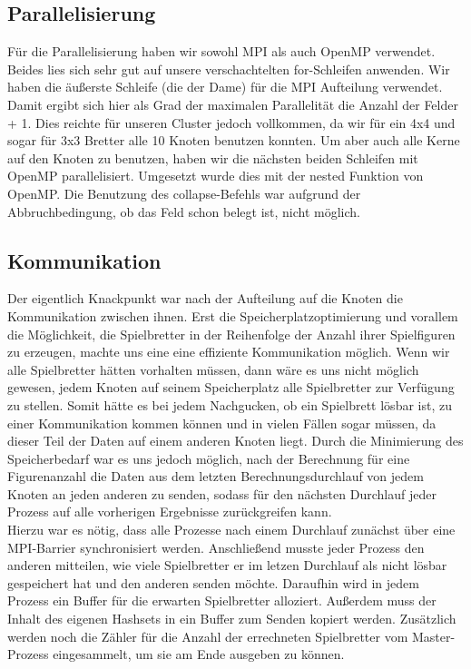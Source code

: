 \documentclass[
	12pt,
	a4paper,
	BCOR10mm,
	DIV14,
	listof=totoc,
	bibliography=totoc,
	headsepline
]{scrreprt}
\begin{document}
\subsection{Parallelisierung}
Für die Parallelisierung haben wir sowohl MPI als auch OpenMP verwendet. Beides lies sich sehr gut auf unsere verschachtelten for-Schleifen anwenden. Wir haben die äußerste Schleife (die der Dame) für die MPI Aufteilung verwendet. Damit ergibt sich hier als Grad der maximalen Parallelität die Anzahl der Felder + 1. Dies reichte für unseren Cluster jedoch vollkommen, da wir für ein 4x4 und sogar für 3x3 Bretter alle 10 Knoten benutzen konnten. 
Um aber auch alle Kerne auf den Knoten zu benutzen, haben wir die nächsten beiden Schleifen mit OpenMP parallelisiert. Umgesetzt wurde dies mit der nested Funktion von OpenMP. Die Benutzung des collapse-Befehls war aufgrund der Abbruchbedingung, ob das Feld schon belegt ist, nicht möglich.


\subsection{Kommunikation}
Der eigentlich Knackpunkt war nach der Aufteilung auf die Knoten die Kommunikation zwischen ihnen. Erst die Speicherplatzoptimierung und vorallem die Möglichkeit, die Spielbretter in der Reihenfolge der Anzahl ihrer Spielfiguren zu erzeugen, machte uns eine eine effiziente Kommunikation möglich.
Wenn wir alle Spielbretter hätten vorhalten müssen, dann wäre es uns nicht möglich gewesen, jedem Knoten auf seinem Speicherplatz alle Spielbretter zur Verfügung zu stellen. Somit hätte es bei jedem Nachgucken, ob ein Spielbrett lösbar ist, zu einer Kommunikation kommen können und in vielen Fällen sogar müssen, da dieser Teil der Daten auf einem anderen Knoten liegt. Durch die Minimierung des Speicherbedarf war es uns jedoch möglich, nach der Berechnung für eine Figurenanzahl die Daten aus dem letzten Berechnungsdurchlauf von jedem Knoten an jeden anderen zu senden, sodass für den nächsten Durchlauf jeder Prozess auf alle vorherigen Ergebnisse zurückgreifen kann.  \\
Hierzu war es nötig, dass alle Prozesse nach einem Durchlauf zunächst über eine MPI-Barrier synchronisiert werden. Anschließend musste jeder Prozess den anderen mitteilen, wie viele Spielbretter er im letzen Durchlauf als nicht lösbar gespeichert hat und den anderen senden möchte. Daraufhin wird in jedem Prozess ein Buffer für die erwarten Spielbretter alloziert. Außerdem muss der Inhalt des eigenen Hashsets in ein Buffer zum Senden kopiert werden.
Zusätzlich werden noch die Zähler für die Anzahl der errechneten Spielbretter vom Master-Prozess eingesammelt, um sie am Ende ausgeben zu können.\\
\\
\\
 
\end{document}
